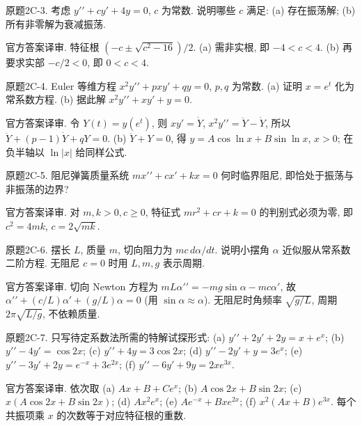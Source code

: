 \begin{exercise}\label{cw:bank-2C-3}
原题2C-3. 考虑 $y\prime\prime+cy\prime+4y=0$, $c$ 为常数. 说明哪些 $c$ 满足: (a) 存在振荡解; (b) 所有非零解为衰减振荡.
\end{exercise}
\begin{solution}
官方答案译审. 特征根 $(-c\pm\sqrt{c^2-16})/2$. (a) 需非实根, 即 $-4<c<4$. (b) 再要求实部 $-c/2<0$, 即 $0<c<4$.
\end{solution}
\begin{exercise}\label{cw:bank-2C-4}
原题2C-4. Euler 等维方程 $x^2y\prime\prime+pxy\prime+qy=0$, $p,q$ 为常数. (a) 证明 $x=e^t$ 化为常系数方程. (b) 据此解 $x^2y\prime\prime+xy\prime+y=0$.
\end{exercise}
\begin{solution}
官方答案译审. 令 $Y(t)=y(e^t)$, 则 $xy\prime=\dot Y$, $x^2y\prime\prime=\ddot Y-\dot Y$, 所以 $\ddot Y+(p-1)\dot Y+qY=0$. (b) $\ddot Y+Y=0$, 得 $y=A\cos\ln x+B\sin\ln x$, $x>0$; 在负半轴以 $\ln|x|$ 给同样公式.
\end{solution}
\begin{exercise}\label{cw:bank-2C-5}
原题2C-5. 阻尼弹簧质量系统 $mx\prime\prime+cx\prime+kx=0$ 何时临界阻尼, 即恰处于振荡与非振荡的边界?
\end{exercise}
\begin{solution}
官方答案译审. 对 $m,k>0,c\ge0$, 特征式 $mr^2+cr+k=0$ 的判别式必须为零, 即 $c^2=4mk$, $c=2\sqrt{mk}$.
\end{solution}
\begin{exercise}\label{cw:bank-2C-6}
原题2C-6. 摆长 $L$, 质量 $m$, 切向阻力为 $mc\,d\alpha/dt$. 说明小摆角 $\alpha$ 近似服从常系数二阶方程. 无阻尼 $c=0$ 时用 $L,m,g$ 表示周期.
\end{exercise}
\begin{solution}
官方答案译审. 切向 Newton 方程为 $mL\alpha\prime\prime=-mg\sin\alpha-mc\alpha\prime$, 故 $\alpha\prime\prime+(c/L)\alpha\prime+(g/L)\alpha=0$ (用 $\sin\alpha\approx\alpha$). 无阻尼时角频率 $\sqrt{g/L}$, 周期 $2\pi\sqrt{L/g}$, 不依赖质量.
\end{solution}
\begin{exercise}\label{cw:bank-2C-7}
原题2C-7. 只写待定系数法所需的特解试探形式: (a) $y\prime\prime+2y\prime+2y=x+e^x$; (b) $y\prime\prime-4y\prime=\cos2x$; (c) $y\prime\prime+4y=3\cos2x$; (d) $y\prime\prime-2y\prime+y=3e^x$; (e) $y\prime\prime-3y\prime+2y=e^{-x}+3e^{2x}$; (f) $y\prime\prime-6y\prime+9y=2xe^{3x}$.
\end{exercise}
\begin{solution}
官方答案译审. 依次取 (a) $Ax+B+Ce^x$; (b) $A\cos2x+B\sin2x$; (c) $x(A\cos2x+B\sin2x)$; (d) $Ax^2e^x$; (e) $Ae^{-x}+Bxe^{2x}$; (f) $x^2(Ax+B)e^{3x}$. 每个共振项乘 $x$ 的次数等于对应特征根的重数.
\end{solution}
